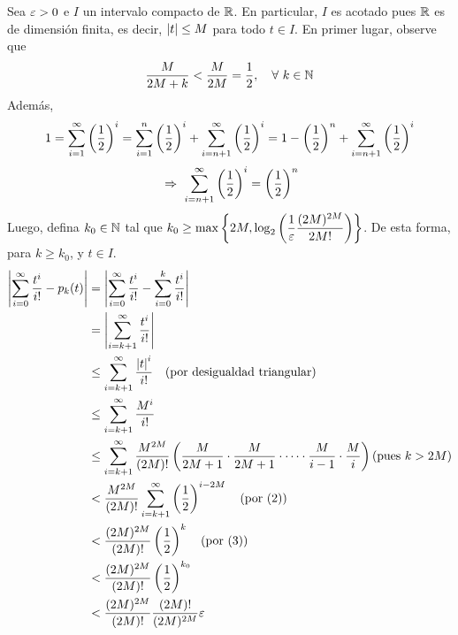 \documentclass[../main.tex]{subfiles}
\begin{document}
\begin{demostracion}
        Sea $\varepsilon > 0$ e $I$ un intervalo compacto de $\mathbb{R}$. En particular, $I$ es acotado pues $\mathbb{R}$ es de dimensión finita, es decir, $\left\vert t \right\vert \leq M$ para todo $t \in I$. En primer lugar, observe que
            \begin{align}
                \frac{M}{2M + k} < \frac{M}{2M} = \frac{1}{2},\quad \forall\ k \in \mathbb{N}
            \end{align}
        Además,
            \begin{align*}
                1 = \sum_{i = 1}^{\infty} \left( \frac{1}{2} \right)^{i} = \sum_{i = 1}^{n} \left( \frac{1}{2} \right)^{i} + \sum_{i = n+1}^{\infty} \left( \frac{1}{2} \right)^{i} = 1 - \left( \frac{1}{2} \right)^{n} + \sum_{i = n+1}^{\infty} \left( \frac{1}{2} \right)^{i}\\
            \end{align*}
            \vspace{-4em}
            \begin{align}
                \ \Rightarrow\  \sum_{i = n+1}^{\infty} \left( \frac{1}{2} \right)^{i} = \left( \frac{1}{2} \right)^{n}
            \end{align}
        Luego, defina $k_0 \in \mathbb{N}$ tal que $\displaystyle k_0 \geq \max \left\lbrace 2M, \log_2 \left(  \frac{1}{\varepsilon} \frac{(2M)^{2M}}{2M!} \right) \right\rbrace$. De esta forma, para $k \geq k_0$, y $t \in I$.
            \begin{align*}
                \abs{ \sum_{i=0}^{\infty} \frac{t^i}{i!} - p_k(t)} &=
                \abs{\sum_{i=0}^{\infty} \frac{t^i}{i!} - \sum_{i=0}^{k} \frac{t^i}{i!}}\\
                &= \abs{\sum_{i=k+1}^{\infty} \frac{t^i}{i!}}\\
                &\leq \sum_{i=k+1}^{\infty} \frac{\abs{t}^i}{i!} \quad \text{(por desigualdad triangular)}\\
                &\leq \sum_{i=k+1}^{\infty} \frac{M^i}{i!}\\
                &\leq \sum_{i=k+1}^{\infty} \frac{M^{2M}}{(2M)!} \pare{ \frac{M}{2M+1} \cdot \frac{M}{2M+1} \cdot \dots \cdot \frac{M}{i-1} \cdot \frac{M}{i}} \text{(pues $k > 2M$)} \\
                &< \frac{M^{2M}}{(2M)!} \sum_{i=k+1}^{\infty} \pare{ \frac{1}{2} }^{i-2M} \quad \text{(por (2))}\\
                &< \frac{(2M)^{2M}}{(2M)!} \pare{\frac{1}{2}}^{k} \quad \text{(por (3))}\\
                &< \frac{(2M)^{2M}}{(2M)!} \pare{\frac{1}{2}}^{k_0}\\
                &< \frac{(2M)^{2M}}{(2M)!} \frac{(2M)!}{(2M)^{2M}} \eps\\

\end{align*}
\end{demostracion}
\end{document}
